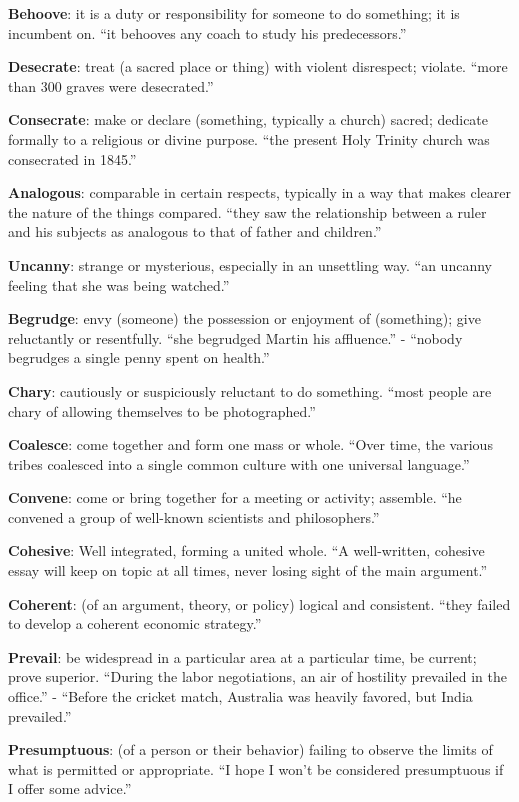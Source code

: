 \documentclass[12pt, a4paper]{ximera}
\begin{document}
\textbf{Behoove}: it is a duty or responsibility for someone to do something; it is incumbent on. ``it behooves any coach to study his predecessors.''

\textbf{Desecrate}: treat (a sacred place or thing) with violent disrespect; violate. ``more than 300 graves were desecrated.''

\textbf{Consecrate}: make or declare (something, typically a church) sacred; dedicate formally to a religious or divine purpose. ``the present Holy Trinity church was consecrated in 1845.''

\textbf{Analogous}: comparable in certain respects, typically in a way that makes clearer the nature of the things compared. ``they saw the relationship between a ruler and his subjects as analogous to that of father and children.''

\textbf{Uncanny}: strange or mysterious, especially in an unsettling way. ``an uncanny feeling that she was being watched.''

\textbf{Begrudge}: envy (someone) the possession or enjoyment of (something); give reluctantly or resentfully. ``she begrudged Martin his affluence.'' - ``nobody begrudges a single penny spent on health.''

\textbf{Chary}: cautiously or suspiciously reluctant to do something. ``most people are chary of allowing themselves to be photographed.''

\textbf{Coalesce}: come together and form one mass or whole. ``Over time, the various tribes coalesced into a single common culture with one universal language.''

\textbf{Convene}: come or bring together for a meeting or activity; assemble. ``he convened a group of well-known scientists and philosophers.''

\textbf{Cohesive}: Well integrated, forming a united whole. ``A well-written, cohesive essay will keep on topic at all times, never losing sight of the main argument.''

\textbf{Coherent}: (of an argument, theory, or policy) logical and consistent. ``they failed to develop a coherent economic strategy.''

\textbf{Prevail}: be widespread in a particular area at a particular time, be current; prove superior. ``During the labor negotiations, an air of hostility prevailed in the office.'' - ``Before the cricket match, Australia was heavily favored, but India prevailed.''

\textbf{Presumptuous}: (of a person or their behavior) failing to observe the limits of what is permitted or appropriate. ``I hope I won't be considered presumptuous if I offer some advice.''
\end{document}
